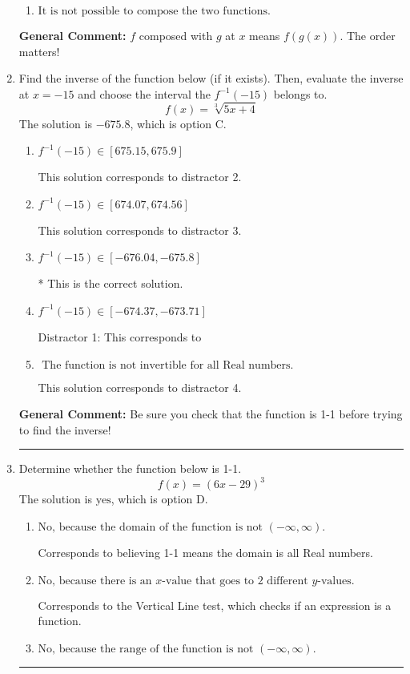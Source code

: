 \documentclass{extbook}[14pt]
\newcommand{\litem}[1]{\item #1

\rule{\textwidth}{0.4pt}}
\begin{document}
\begin{enumerate}
{\begin{enumerate}[label=\Alph*.]
 Distractor 1: Corresponds to reversing the composition.
\item \( \text{It is not possible to compose the two functions.} \)


\end{enumerate}

\textbf{General Comment:} $f$ composed with $g$ at $x$ means $f(g(x))$. The order matters!
}
\litem{
Find the inverse of the function below (if it exists). Then, evaluate the inverse at $x = -15$ and choose the interval the $f^{-1}(-15)$ belongs to.
\[ f(x) = \sqrt[3]{5 x + 4} \]
The solution is \( -675.8 \), which is option C.\begin{enumerate}[label=\Alph*.]
\item \( f^{-1}(-15) \in [675.15, 675.9] \)

 This solution corresponds to distractor 2.
\item \( f^{-1}(-15) \in [674.07, 674.56] \)

 This solution corresponds to distractor 3.
\item \( f^{-1}(-15) \in [-676.04, -675.8] \)

* This is the correct solution.
\item \( f^{-1}(-15) \in [-674.37, -673.71] \)

 Distractor 1: This corresponds to 
\item \( \text{ The function is not invertible for all Real numbers. } \)

 This solution corresponds to distractor 4.
\end{enumerate}

\textbf{General Comment:} Be sure you check that the function is 1-1 before trying to find the inverse!
}
\litem{
Determine whether the function below is 1-1.
\[ f(x) = (6 x - 29)^3 \]
The solution is \( \text{yes} \), which is option D.\begin{enumerate}[label=\Alph*.]
\item \( \text{No, because the domain of the function is not $(-\infty, \infty)$.} \)

Corresponds to believing 1-1 means the domain is all Real numbers.
\item \( \text{No, because there is an $x$-value that goes to 2 different $y$-values.} \)

Corresponds to the Vertical Line test, which checks if an expression is a function.
\item \( \text{No, because the range of the function is not $(-\infty, \infty)$.} \)


\end{enumerate}}
\end{enumerate}
\end{document}
